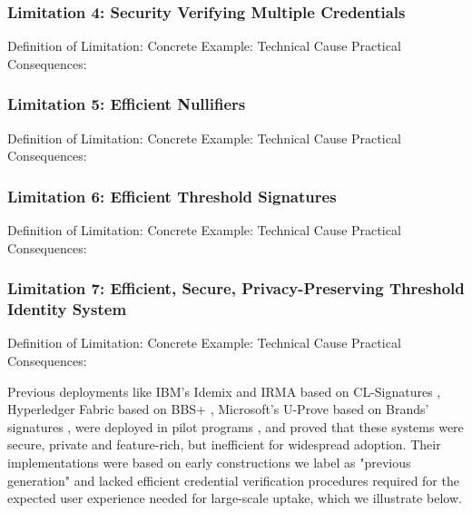 \subsubsection{Limitation 4: Security Verifying Multiple Credentials}
Definition of Limitation: 
Concrete Example:
Technical Cause
Practical Consequences:


\subsubsection{Limitation 5: Efficient Nullifiers}
Definition of Limitation: 
Concrete Example:
Technical Cause
Practical Consequences:




\subsubsection{Limitation 6: Efficient Threshold Signatures}
Definition of Limitation: 
Concrete Example:
Technical Cause
Practical Consequences:


\subsubsection{Limitation 7: Efficient, Secure, Privacy-Preserving Threshold Identity System}
Definition of Limitation: 
Concrete Example:
Technical Cause
Practical Consequences:















Previous deployments like IBM's Idemix \cite{camenisch_design_2002} and IRMA \cite{fischer-hubner_towards_2013} based on CL-Signatures \cite{camenisch_design_2002, cimato_signature_2003}, Hyperledger Fabric \cite{androulaki_hyperledger_2018} based on BBS+ \cite{hutchison_constant-size_2006}, Microsoft's U-Prove \cite{dunkelman_formal_2016} based on Brands' signatures \cite{brands_rethinking_2000}, were deployed in pilot programs \cite{dunkelman_formal_2016}, and proved that these systems were secure, private and feature-rich, but inefficient for widespread adoption. Their implementations were based on early constructions we label as "previous generation" and lacked efficient credential verification procedures required for the expected user experience needed for large-scale uptake, which we illustrate below.

